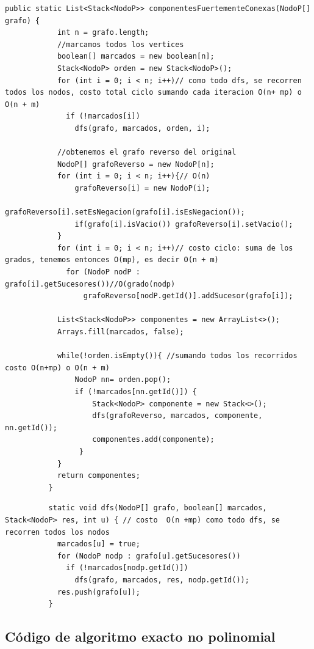 \documentclass[a4paper]{article}
\begin{document}
\begin{lstlisting}
public static List<Stack<NodoP>> componentesFuertementeConexas(NodoP[] grafo) {
		    int n = grafo.length;
		    //marcamos todos los vertices
		    boolean[] marcados = new boolean[n];
		    Stack<NodoP> orden = new Stack<NodoP>();
		    for (int i = 0; i < n; i++)// como todo dfs, se recorren todos los nodos, costo total ciclo sumando cada iteracion O(n+ mp) o O(n + m)
		      if (!marcados[i])
		        dfs(grafo, marcados, orden, i);

		    //obtenemos el grafo reverso del original
		    NodoP[] grafoReverso = new NodoP[n];
		    for (int i = 0; i < n; i++){// O(n)
		    	grafoReverso[i] = new NodoP(i);
		    	grafoReverso[i].setEsNegacion(grafo[i].isEsNegacion());
		    	if(grafo[i].isVacio()) grafoReverso[i].setVacio();
		    }
		    for (int i = 0; i < n; i++)// costo ciclo: suma de los grados, tenemos entonces O(mp), es decir O(n + m)
		      for (NodoP nodP : grafo[i].getSucesores())//O(grado(nodp)
		    	  grafoReverso[nodP.getId()].addSucesor(grafo[i]);
		    
		    List<Stack<NodoP>> componentes = new ArrayList<>();
		    Arrays.fill(marcados, false);
		    
		    while(!orden.isEmpty()){ //sumando todos los recorridos costo O(n+mp) o O(n + m)
			    NodoP nn= orden.pop();
			    if (!marcados[nn.getId()]) {
			    	Stack<NodoP> componente = new Stack<>();
			    	dfs(grafoReverso, marcados, componente, nn.getId());
			        componentes.add(componente);
			     }
		    }		   
		    return componentes;
		  }
\end{lstlisting}

\begin{lstlisting}
		  static void dfs(NodoP[] grafo, boolean[] marcados, Stack<NodoP> res, int u) { // costo  O(n +mp) como todo dfs, se recorren todos los nodos
		    marcados[u] = true;
		    for (NodoP nodp : grafo[u].getSucesores())
		      if (!marcados[nodp.getId()])
		        dfs(grafo, marcados, res, nodp.getId());
		    res.push(grafo[u]);
		  }
\end{lstlisting}


\newpage
\subsection{Código de algoritmo exacto no polinomial}
\end{document}
